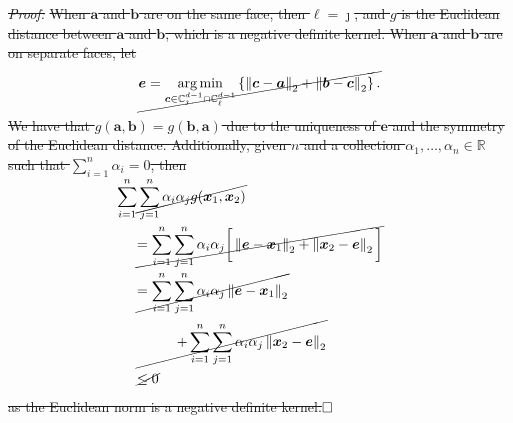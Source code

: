 \documentclass[iicol,sn-basic]{sn-jnl}
\DeclareMathOperator*{\argmin}{arg\,min}
\newcommand{\norm}[1]{\left\lVert #1 \right\rVert}
\newcommand{\pnorm}[2]{\norm{#1}_{#2}}
\theoremstyle{thmstyleone}
\begin{document}
\st{{\em Proof:}}
\st{When $\bm{a}$ and $\bm{b}$ are on the same face, then $\ell = \jmath$, and $g$ is the Euclidean distance between $\bm{a}$ and $\bm{b}$, which is a  negative definite kernel.  When $\bm{a}$ and $\bm{b}$ are on separate faces, let}
\[\cancel{\bm{e} =
\argmin_{\bm{c} \in{\mathbb C}_{\jmath}^{d-1}\cap{\mathbb C}_{\ell}^{d-1}}\left\{
\pnorm{\bm{c}-\bm{a}}{2} + \pnorm{\bm{b}-\bm{c}}{2} \right\}.}
\]
\st{We have that $g(\bm{a}, \bm{b}) = g(\bm{b}, \bm{a})$ due to the uniqueness of $\bm{e}$ and the symmetry of the Euclidean distance. Additionally, given $n$ and  a collection $\alpha_1,\ldots,\alpha_n\in{\mathbb R}$ such that  $\sum_{i = 1}^n\alpha_i = 0$, then}
\begin{equation*}
    \begin{aligned}
    &\cancel{\hspace{-0.5cm}\sum_{i = 1}^n\sum_{j = 1}^n \alpha_i\alpha_j g(\bm{x}_1,\bm{x}_2)}\\
    &\cancel{= \sum_{i = 1}^n\sum_{j = 1}^n \alpha_i\alpha_j \bigg[\pnorm{\bm{e} - \bm{x}_1}{2} + \pnorm{\bm{x}_2 - \bm{e}}{2}\bigg]}\\
    &\cancel{= \sum_{i = 1}^n\sum_{j = 1}^n \alpha_i\alpha_j\pnorm{\bm{e} - \bm{x}_1}{2}}\\
    &\cancel{\hspace{1cm}+ \sum_{i = 1}^n\sum_{j = 1}^n \alpha_i\alpha_j\pnorm{\bm{x}_2 - \bm{e}}{2}}\\
    &\cancel{\leq 0}
    \end{aligned}
    \end{equation*}
\st{as the Euclidean norm is a negative definite kernel.$\hfill\Box$}
\end{document}

